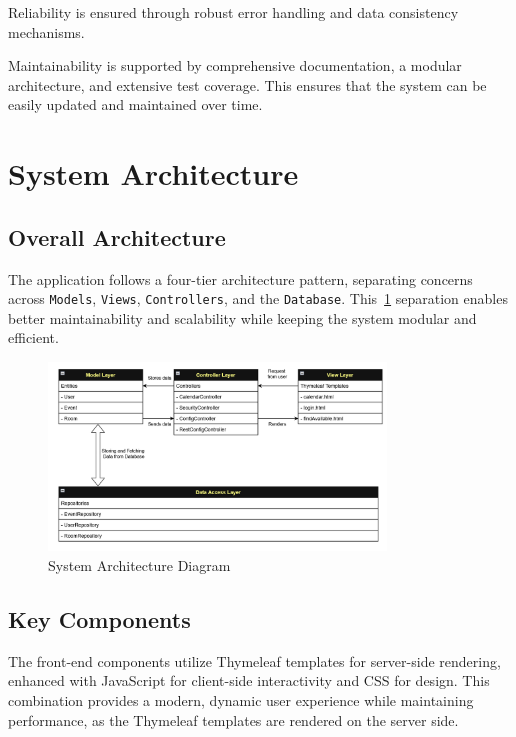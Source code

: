 Reliability is ensured through robust error handling and data consistency mechanisms.

Maintainability is supported by comprehensive documentation, a modular architecture, and extensive test coverage.
This ensures that the system can be easily updated and maintained over time.

\section{System Architecture}\label{sec:system-architecture}

\subsection{Overall Architecture}\label{subsec:overall-architecture}
The application follows a four-tier architecture pattern, separating concerns across \texttt{Models}, \texttt{Views}, \texttt{Controllers}, and the \texttt{Database}.
This~\ref{fig:architecture} separation enables better maintainability and scalability while keeping the system modular and efficient.

\begin{figure}[h]
    \centering
    \includegraphics[width=0.8\textwidth]{MVCSchema}
    \caption{System Architecture Diagram}
    \label{fig:architecture}
\end{figure}

\subsection{Key Components}\label{subsec:key-components}

The front-end components utilize Thymeleaf templates for server-side rendering, enhanced with JavaScript for client-side interactivity and CSS for design.
This combination provides a modern, dynamic user experience while maintaining performance, as the Thymeleaf templates are rendered on the server side.

